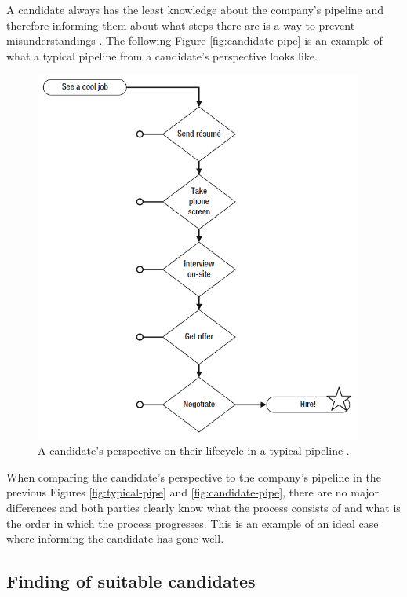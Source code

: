 \documentclass[11pt,a4paper,oneside,article]{memoir}
\begin{document}
A candidate always has the least knowledge about the company's pipeline and therefore informing them about what steps there are is a way to prevent misunderstandings \cite[p.~26]{mcculler:book}. The following Figure \vref{fig:candidate-pipe} is an example of what a typical pipeline from a candidate's perspective looks like.

\begin{figure}[h]
  \centering
  \includegraphics[width=10.8cm]{candidate_pipe}
  \caption{A candidate's perspective on their lifecycle in a typical pipeline \cite[p.~27]{mcculler:book}.}
  \label{fig:candidate-pipe}
\end{figure}

When comparing the candidate's perspective to the company's pipeline in the previous Figures \vref{fig:typical-pipe} and  \vref{fig:candidate-pipe}, there are no major differences and both parties clearly know what the process consists of and what is the order in which the process progresses. This is an example of an ideal case where informing the candidate has gone well.

\subsection{Finding of suitable candidates}
\end{document}
